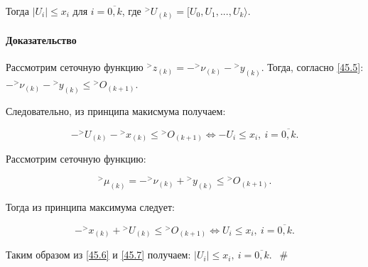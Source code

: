 \documentclass[__main__.tex]{subfiles}
\begin{document}
Тогда $\left|U_i\right| \leq x_i$ для $i = \overline{0,k}$, где ${}^> U_{\left(k\right)} = [ U_0, U_1, ..., U_k \rangle$.

\paragraph{Доказательство}

Рассмотрим сеточную функцию ${}^> z_{\left(k\right)} = - {}^> \nu_{\left(k\right)} - {}^> y_{\left(k\right)}$. Тогда, согласно \ref{45.5}: $- {}^>\nu_{\left(k\right)} - {}^> y_{\left(k\right)}\leq {}^> O_{\left(k+1\right)}$. 

Следовательно, из принципа макисмума получаем:

\begin{equation} \label{45.6}
- {}^> U_{\left(k\right)} - {}^> x_{\left(k\right)} \leq {}^> O_{\left(k+1\right)} \Leftrightarrow - U_i \leq x_i, \ i = \overline{0,k}.
\end{equation}

Рассмотрим сеточную функцию:

$$
{}^> \mu_{\left(k\right)} = - {}^> \nu_{\left(k\right)} + {}^> y_{\left(k\right)} \leq {}^> O_{\left(k+1\right)}.
$$

Тогда из принципа максимума следует:

\begin{equation}\label{45.7}
- {}^> x_{\left(k\right)} + {}^> U_{\left(k\right)} \leq {}^> O_{\left(k+1\right)} \Leftrightarrow U_i \leq x_i, \ i= \overline{0,k}.
\end{equation}

Таким образом из \ref{45.6} и \ref{45.7} получаем: $\left|U_i\right| \leq x_i, \ i = \overline{0,k}$. $\ \ \#$
\end{document}
